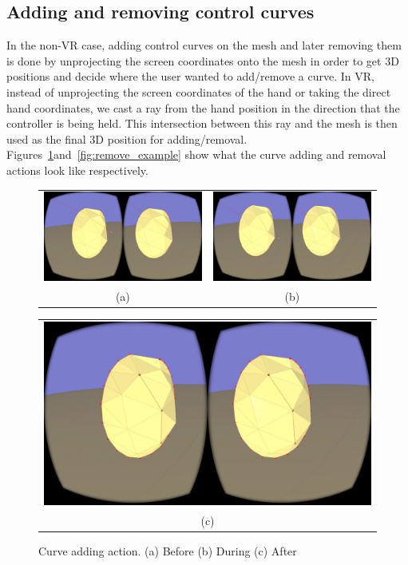 \subsection{Adding and removing control curves}
In the non-VR case, adding control curves on the mesh and later removing them is done by unprojecting the screen coordinates onto the mesh in order to get 3D positions and decide where the user wanted to add/remove a curve. In VR, instead of unprojecting the screen coordinates of the hand or taking the direct hand coordinates, we cast a ray from the hand position in the direction that the controller is being held. This intersection between this ray and the mesh is then used as the final 3D position for adding/removal. Figures~\ref{fig:add_example}and~\ref{fig:remove_example} show what the curve adding and removal actions look like respectively.

\begin{figure}[!h]
    \centering
    \setlength{\tabcolsep}{0.0130\linewidth}
    \begin{tabular}{@{}cc@{}}
    \includegraphics[width=0.45\linewidth]{figures/pre_add} &
       	\includegraphics[width=0.45\linewidth]{figures/during_add} \\
       	(a)&(b)\\
       	\end{tabular}
       	
       	  \centering
    \setlength{\tabcolsep}{0.0130\linewidth}
    \begin{tabular}{@{}c@{}}
    \includegraphics[width=0.926\linewidth]{figures/post_add}\\
    (c)
    \end{tabular}
    \caption[Curve adding action]{Curve adding action.
    	  \textup{(a)} Before \textup{(b)} During \textup{(c)} After
      \label{fig:add_example}}
\end{figure}

